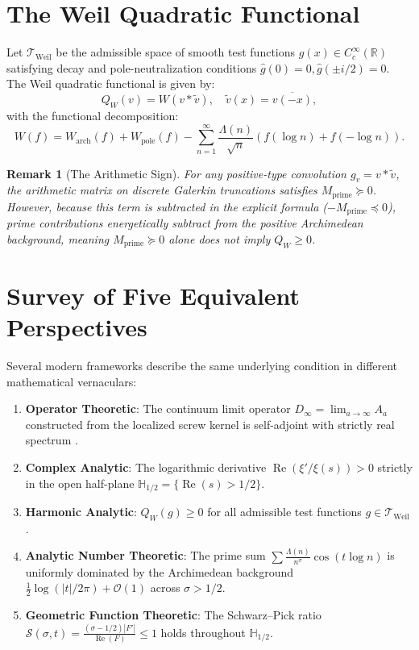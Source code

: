 \documentclass[12pt, a4paper]{article}
\newtheorem{remark}{Remark}[section]
\begin{document}
\section{The Weil Quadratic Functional}
Let $\mathcal{T}_{\text{Weil}}$ be the admissible space of smooth test functions $g(x) \in C_c^\infty(\mathbb{R})$ satisfying decay and pole-neutralization conditions $\widehat{g}(0) = 0, \widehat{g}(\pm i/2) = 0$. The Weil quadratic functional is given by:
\begin{equation}
Q_W(v) = W(v * \widetilde{v}), \quad \widetilde{v}(x) = \overline{v(-x)},
\end{equation}
with the functional decomposition:
\begin{equation}
W(f) = W_{\text{arch}}(f) + W_{\text{pole}}(f) - \sum_{n=1}^\infty \frac{\Lambda(n)}{\sqrt{n}} \left( f(\log n) + f(-\log n) \right).
\end{equation}

\begin{remark}[The Arithmetic Sign]
For any positive-type convolution $g_v = v * \widetilde{v}$, the arithmetic matrix on discrete Galerkin truncations satisfies $M_{\text{prime}} \succeq 0$. However, because this term is subtracted in the explicit formula ($-M_{\text{prime}} \preceq 0$), prime contributions energetically subtract from the positive Archimedean background, meaning $M_{\text{prime}} \succeq 0$ alone does not imply $Q_W \ge 0$.
\end{remark}

\section{Survey of Five Equivalent Perspectives}
Several modern frameworks describe the same underlying condition in different mathematical vernaculars:

\begin{enumerate}
    \item \textbf{Operator Theoretic}: The continuum limit operator $D_\infty = \lim_{a\to\infty} A_a$ constructed from the localized screw kernel is self-adjoint with strictly real spectrum \cite{Suzuki2026}.
    \item \textbf{Complex Analytic}: The logarithmic derivative $\operatorname{Re}(\xi'/\xi(s)) > 0$ strictly in the open half-plane $\mathbb{H}_{1/2} = \{\operatorname{Re}(s) > 1/2\}$.
    \item \textbf{Harmonic Analytic}: $Q_W(g) \ge 0$ for all admissible test functions $g \in \mathcal{T}_{\text{Weil}}$ \cite{Weil1952}.
    \item \textbf{Analytic Number Theoretic}: The prime sum $\sum \frac{\Lambda(n)}{n^\sigma}\cos(t\log n)$ is uniformly dominated by the Archimedean background $\frac{1}{2}\log(|t|/2\pi) + \mathcal{O}(1)$ across $\sigma > 1/2$.
    \item \textbf{Geometric Function Theoretic}: The Schwarz--Pick ratio $\mathcal{S}(\sigma, t) = \frac{(\sigma-1/2)|F'|}{\operatorname{Re}(F)} \le 1$ holds throughout $\mathbb{H}_{1/2}$.
\end{enumerate}
\end{document}
